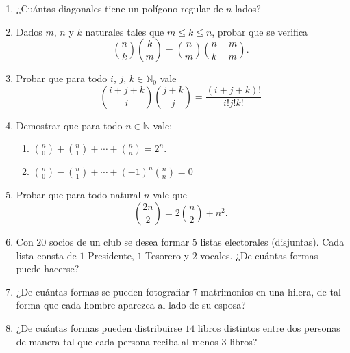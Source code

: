 \documentclass[12pt,spanish,makeidx]{amsbook}
\begin{document}
\begin {enumerate}
\smallskip

\item ¿Cuántas diagonales tiene un polígono regular de $n$ lados?

\smallskip

\item Dados $m$, $n$ y $k$ naturales tales que $m \le k \le n$, probar que se verifica
\begin{equation*}
	\binom{n}{k}\binom{k}{m} = \binom{n}{m}\binom{n-m}{k-m}.
\end{equation*}


\smallskip

\item Probar que para todo $i$, $j$, $k \in {\mathbb N}_0$ vale
\begin{equation*}
	\binom{i + j + k}{i}\binom{j+k}{j} = \frac{(i+j+k)!}{i!j!k!}
\end{equation*}

\smallskip

\item Demostrar que para todo $n \in \mathbb N$ vale:
\begin{enumerate}
  \item $\displaystyle{\binom{n}{0} + \binom{n}{1} + \cdots + \binom{n}{n} = 2^n}$.
\medskip
  \item $\displaystyle{\binom{n}{0} - \binom{n}{1} + \cdots + (-1)^n\binom{n}{n} = 0}$
  \end{enumerate}

\smallskip

\item Probar que para todo natural $n$ vale que 
\begin{equation*}
	\binom{2n}{2} = 2 \binom{n}{2} + n^2.
\end{equation*}


\smallskip



\item Con $20$ socios de un club se desea formar $5$ listas electorales (disjuntas).
Cada lista consta de $1$ Presidente, $1$ Tesorero y $2$ vocales.  ¿De cuántas
formas puede hacerse?

\smallskip

\item ¿De cuántas formas se pueden fotografiar $7$ matrimonios en una hilera,
de tal forma que cada hombre aparezca al lado de su esposa?

\smallskip

\item ¿De cuántas formas pueden distribuirse $14$ libros distintos entre dos
personas de manera tal que cada persona reciba al menos $3$ libros?
\end{enumerate}
\end{document}
